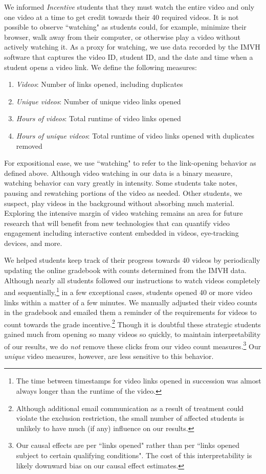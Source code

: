 \documentclass[12pt]{article}
\begin{document}
We informed \textit{Incentive} students that they must watch the entire video and only one video at a time to get credit towards their 40 required videos. It is not possible to observe ``watching" as students could, for example, minimize their browser, walk away from their computer, or otherwise play a video without actively watching it. As a proxy for watching, we use data recorded by the IMVH software that captures the video ID, student ID, and the date and time when a student opens a video link. We define the following measures:
\begin{enumerate}
	\item \textit{Videos}: Number of links opened, including duplicates
	\item \textit{Unique videos}: Number of unique video links opened
	\item \textit{Hours of videos}: Total runtime of video links opened
	\item \textit{Hours of unique videos}: Total runtime of video links opened with duplicates removed
\end{enumerate}

For expositional ease, we use ``watching" to refer to the link-opening behavior as defined above. Although video watching in our data is a binary measure, watching behavior can vary greatly in intensity. Some students take notes, pausing and rewatching portions of the video as needed. Other students, we suspect, play videos in the background without absorbing much material. Exploring the intensive margin of video watching remains an area for future research that will benefit from new technologies that can quantify video engagement including interactive content embedded in videos, eye-tracking devices, and more.

We helped students keep track of their progress towards 40 videos by periodically updating the online gradebook with counts determined from the IMVH data. Although nearly all students followed our instructions to watch videos completely and sequentially,\footnote{The time between timestamps for video links opened in succession was almost always longer than the runtime of the video.} in a few exceptional cases, students opened 40 or more video links within a matter of a few minutes. We manually adjusted their video counts in the gradebook and emailed them a reminder of the requirements for videos to count towards the grade incentive.\footnote{Although additional email communication as a result of treatment could violate the exclusion restriction, the small number of affected students is unlikely to have much (if any) influence on our results.} Though it is doubtful these strategic students gained much from opening so many videos so quickly, to maintain interpretability of our results, we do \textit{not} remove these clicks from our video count measures.\footnote{Our causal effects are per ``links opened" rather than per ``links opened subject to certain qualifying conditions". The cost of this interpretability is likely downward bias on our causal effect estimates.} Our \textit{unique} video measures, however, are less sensitive to this behavior.
\end{document}
